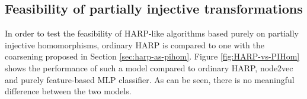 \subsection{Feasibility of partially injective transformations}\label{sec:harp-vs-pihom}

In order to test the feasibility of HARP-like algorithms based purely on partially injective homomorphisms, ordinary HARP is compared to one with the coarsening proposed in Section \ref{sec:harp-as-pihom}. Figure \ref{fig:HARP-vs-PIHom} shows the performance of such a model compared to ordinary HARP, node2vec and purely feature-based MLP classifier. As can be seen, there is no meaningful difference between the two models.
